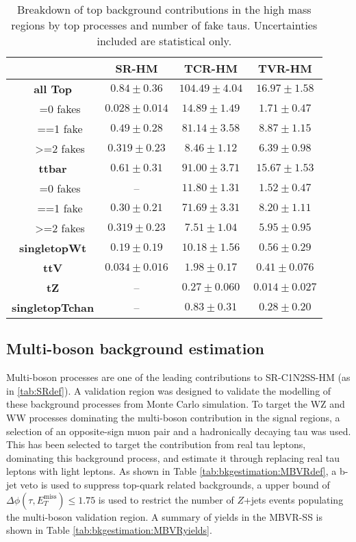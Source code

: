 \begin{table}
  \centering
\begin{tabular}{|cc|c|c|c|}
\hline
\multicolumn{2}{|c|}{} & \textbf{SR-HM} & \textbf{TCR-HM} & \textbf{TVR-HM}\tabularnewline
\hline
\hline
\multicolumn{2}{|c|}{\textbf{all Top}} & \textbf{$\mathbf{0.84\pm0.36}$} & $104.49\pm4.04$ & $16.97\pm1.58$\tabularnewline
\hline
\hline
 & =0 fakes & $0.028\pm0.014$ & $14.89\pm1.49$ & $1.71\pm0.47$\tabularnewline
\hline
 & ==1 fake & $0.49\pm0.28$ & $81.14\pm3.58$ & $8.87\pm1.15$\tabularnewline
\hline
 & \textgreater =2 fakes & $0.319\pm0.23$ & $8.46\pm1.12$ & $6.39\pm0.98$\tabularnewline
\hline
\hline
\multicolumn{2}{|c|}{\textbf{ttbar}} & $0.61\pm0.31$ & $91.00\pm3.71$ & $15.67\pm1.53$\tabularnewline
\hline
\hline
 & =0 fakes & -- & $11.80\pm1.31$ & $1.52\pm0.47$\tabularnewline
\hline
 & ==1 fake & $0.30\pm0.21$ & $71.69\pm3.31$ & $8.20\pm1.11$\tabularnewline
\hline
 & \textgreater =2 fakes & $0.319\pm0.23$ & $7.51\pm1.04$ & $5.95\pm0.95$\tabularnewline
\hline
\multicolumn{2}{|c|}{\textbf{singletopWt}} & $0.19\pm0.19$ & $10.18\pm1.56$ & $0.56\pm0.29$\tabularnewline
\hline
\multicolumn{2}{|c|}{\textbf{ttV}} & $0.034\pm0.016$ & $1.98\pm0.17$ & $0.41\pm0.076$\tabularnewline
\hline
\multicolumn{2}{|c|}{\textbf{tZ}} & -- & $0.27\pm0.060$ & $0.014\pm0.027$\tabularnewline
\hline
\multicolumn{2}{|c|}{\textbf{singletopTchan}} & -- & $0.83\pm0.31$ & $0.28\pm0.20$\tabularnewline
\hline
\end{tabular}
\caption{Breakdown of top background contributions in the high mass regions by top processes and number of fake taus. Uncertainties included are statistical only. \label{tab:app:c1n2ss:topbreakdownhigh}}
\end{table}

\FloatBarrier
\subsection{Multi-boson background estimation}

Multi-boson processes are one of the leading contributions to SR-C1N2SS-HM  (as in \ref{tab:SRdef}). A validation region was designed to validate the modelling of these background processes from Monte Carlo simulation. 
To target the WZ and WW processes dominating the multi-boson contribution in the signal regions,  a selection of an opposite-sign muon pair and a hadronically decaying tau was used. This has been selected to target the contribution from real tau leptons, dominating this background process,  and estimate it through replacing real tau leptons with light leptons. 
As shown in Table \ref{tab:bkgestimation:MBVRdef}, a b-jet veto is used to suppress top-quark related backgrounds, a upper bound of $\Delta\phi (\tau,E_T^\text{miss}) \leq 1.75$ is used to restrict the
number of $Z$+jets events populating the multi-boson validation region. A summary of yields in the MBVR-SS is shown in Table \ref{tab:bkgestimation:MBVRyields}. 

